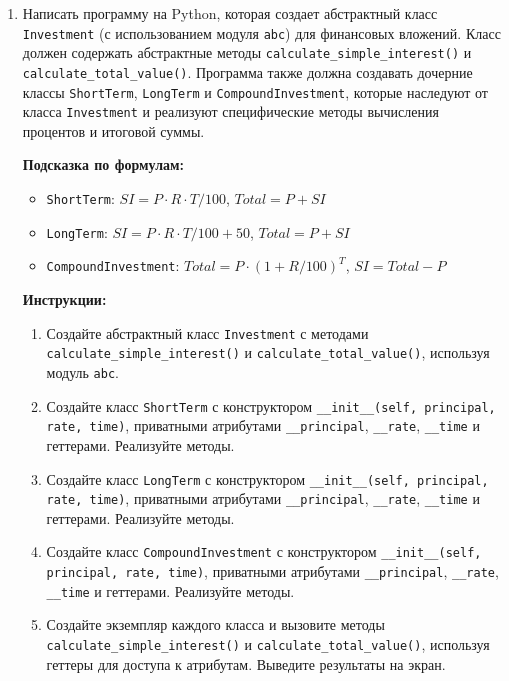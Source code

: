 \begin{enumerate}
\item
Написать программу на Python, которая создает абстрактный класс \texttt{Investment} (с использованием модуля \texttt{abc}) для финансовых вложений. 
Класс должен содержать абстрактные методы \texttt{calculate\_simple\_interest()} и \texttt{calculate\_total\_value()}. 
Программа также должна создавать дочерние классы \texttt{ShortTerm}, \texttt{LongTerm} и \texttt{CompoundInvestment}, 
которые наследуют от класса \texttt{Investment} и реализуют специфические методы вычисления процентов и итоговой суммы.

\textbf{Подсказка по формулам:}
\begin{itemize}
    \item \texttt{ShortTerm}: $SI = P \cdot R \cdot T / 100$, $Total = P + SI$
    \item \texttt{LongTerm}: $SI = P \cdot R \cdot T / 100 + 50$, $Total = P + SI$
    \item \texttt{CompoundInvestment}: $Total = P \cdot (1 + R/100)^T$, $SI = Total - P$
\end{itemize}

\textbf{Инструкции:}
\begin{enumerate}
    \item Создайте абстрактный класс \texttt{Investment} с методами \texttt{calculate\_simple\_interest()} и \texttt{calculate\_total\_value()}, используя модуль \texttt{abc}.
    \item Создайте класс \texttt{ShortTerm} с конструктором \texttt{\_\_init\_\_(self, principal, rate, time)}, приватными атрибутами \texttt{\_\_principal}, \texttt{\_\_rate}, \texttt{\_\_time} и геттерами. Реализуйте методы.
    \item Создайте класс \texttt{LongTerm} с конструктором \texttt{\_\_init\_\_(self, principal, rate, time)}, приватными атрибутами \texttt{\_\_principal}, \texttt{\_\_rate}, \texttt{\_\_time} и геттерами. Реализуйте методы.
    \item Создайте класс \texttt{CompoundInvestment} с конструктором \texttt{\_\_init\_\_(self, principal, rate, time)}, приватными атрибутами \texttt{\_\_principal}, \texttt{\_\_rate}, \texttt{\_\_time} и геттерами. Реализуйте методы.
    \item Создайте экземпляр каждого класса и вызовите методы \texttt{calculate\_simple\_interest()} и \texttt{calculate\_total\_value()}, используя геттеры для доступа к атрибутам. Выведите результаты на экран.
\end{enumerate}


\end{enumerate}
